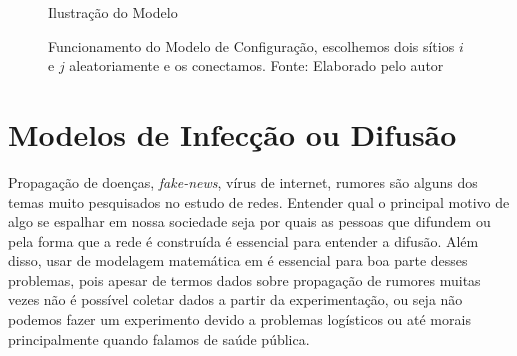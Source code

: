 \begin{figure}[H]
  \centering
  \captionsetup{font=normalsize,skip=0.8pt,singlelinecheck=on,labelsep=endash}
  \caption{Ilustração do Modelo}
  \captionsetup{font=small}
  \caption{Funcionamento do Modelo de Configuração, escolhemos dois sítios $i$ e $j$ aleatoriamente e os conectamos. Fonte: Elaborado pelo autor}
  \label{img:MC}
\end{figure}

\section{Modelos de Infecção ou Difusão}

Propagação de doenças, \textit{fake-news}, vírus de internet, rumores são alguns dos temas muito pesquisados no estudo de redes. Entender qual o principal motivo de algo se espalhar em nossa sociedade seja por quais as pessoas que difundem ou pela forma que a rede é construída é essencial para entender a difusão. Além disso, usar de modelagem matemática em é essencial para boa parte desses problemas, pois apesar de termos dados sobre propagação de rumores \cite{rumor} muitas vezes não é possível coletar dados a partir da experimentação, ou seja não podemos fazer um experimento devido a problemas logísticos ou até morais principalmente quando falamos de saúde pública.

